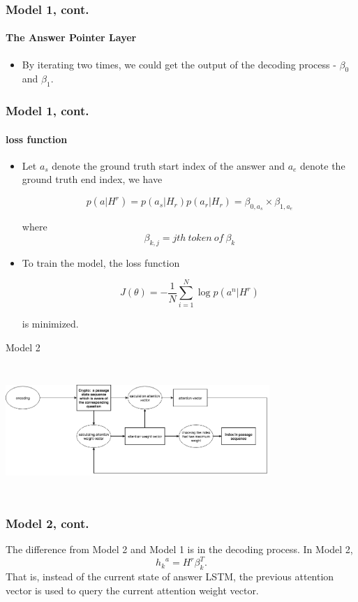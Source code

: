 \documentclass{beamer}
\begin{document}
\begin{frame}\frametitle{Model 1, cont.}\framesubtitle{The Answer Pointer Layer}
    \begin{itemize}
        \item By iterating two times, we could get the output of the decoding process - $\beta _0$ and $\beta _1$.
    \end{itemize}

\end{frame}

\begin{frame}\frametitle{Model 1, cont.}\framesubtitle{loss function}
    \begin{itemize}
        \item Let $a_s$ denote the ground truth start index of the answer and $a_e$ denote the ground truth end index, we have

        $$p(a|H^r) = p(a_s|H_r)p(a_r|H_r)=\beta _{0, a_s} \times \beta_{1, a_e}$$

        where $$\beta_{k, j} = jth\ token\ of\ \beta _k$$
        \item To train the model, the loss function

        $$J(\theta) = -\frac{1}{N}\sum_{i=1}^{N} \log{p(a^n|H^r)} $$

        is minimized.

    \end{itemize}

\end{frame}

\begin{frame}{Model 2}
    \begin{center}
        \includegraphics[width=10cm, height=5cm]{figures/model2_decoder.png}
    \end{center}
\end{frame}
\begin{frame} \frametitle{Model 2, cont.}
    The difference from Model 2 and Model 1 is in the decoding process. In Model 2,
    $${h_k}^a = H^r\beta _{k}^T.$$
    That is, instead of the current state of answer LSTM, the previous attention vector is used to query the current attention weight vector.
\end{frame}
\end{document}
